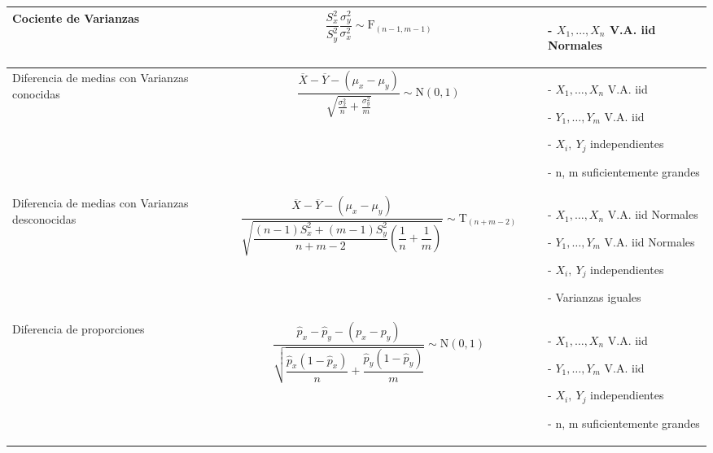 \documentclass[pdftex,11pt,a4paper]{article}
\begin{document}
\begin{tabular}{m{3.5cm} m{7.3cm} m{6.5cm}}
Cociente de Varianzas & 
$$\dfrac{S^2_x}{S^2_y}\dfrac{\sigma^2_y}{\sigma^2_x} \sim \text{F}_{\left(n-1,m-1\right)}$$ &
\begin{itemize}
\item[-] $X_1,\ldots, X_n$ V.A. iid Normales
\end{itemize}\\ 
\hline


Diferencia de medias con Varianzas conocidas & 
$$\dfrac{\overline{X}-\overline{Y}-\left(\mu_x - \mu_y\right)}{\sqrt{\frac{\sigma^2_x}{n}+\frac{\sigma^2_y}{m}}} \sim \text{N}(0,1)$$ &
\begin{itemize}
\item[-] $X_1,\ldots, X_n$ V.A. iid 
\item[-] $Y_1,\ldots, Y_m$ V.A. iid 
\item[-] $X_i,\ Y_j$ independientes
\item[-] n, m suficientemente grandes
\end{itemize}\\ 
\hline

Diferencia de medias con Varianzas desconocidas & 
$$\dfrac{\overline{X}-\overline{Y}-\left(\mu_x - \mu_y\right)}{\sqrt{\dfrac{\left(n-1\right)S^2_x + \left(m-1\right)S^2_y}{n+m-2}\left(\dfrac{1}{n} + \dfrac{1}{m}\right)}} \sim \text{T}_{\left(n+m-2\right)}$$ &
\begin{itemize}
\item[-] $X_1,\ldots, X_n$ V.A. iid Normales
\item[-] $Y_1,\ldots, Y_m$ V.A. iid Normales
\item[-] $X_i,\ Y_j$ independientes
\item[-] Varianzas iguales
\end{itemize}\\ 
\hline


Diferencia de proporciones & 
$$\dfrac{\hat{p}_x - \hat{p}_y - \left(p_x - p_y\right)}{\sqrt{\dfrac{\hat{p}_x\left(1-\hat{p}_x\right)}{n} + \dfrac{\hat{p}_y\left(1-\hat{p}_y\right)}{m}}}  \sim \text{N}(0,1)$$ &
\begin{itemize}
\item[-] $X_1,\ldots, X_n$ V.A. iid 
\item[-] $Y_1,\ldots, Y_m$ V.A. iid 
\item[-] $X_i,\ Y_j$ independientes
\item[-] n, m suficientemente grandes
\end{itemize}\\ 


\end{tabular} 
\end{document}
